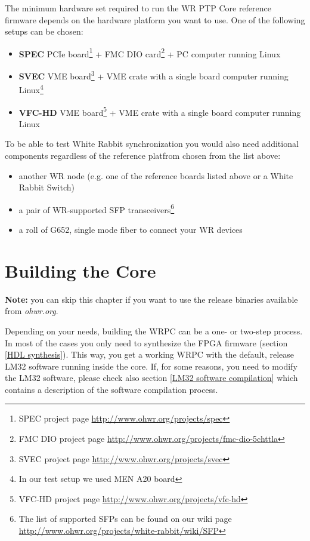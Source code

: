 \documentclass[a4paper, 12pt]{article}
\begin{document}
The minimum hardware set required to run the WR PTP Core reference firmware
depends on the hardware platform you want to use. One of the following setups
can be chosen:
\begin{itemize}
  \item {\bf SPEC} PCIe board\footnote{SPEC project page
    \url{http://www.ohwr.org/projects/spec}} + FMC DIO card\footnote{FMC DIO
    project page \url{http://www.ohwr.org/projects/fmc-dio-5chttla}} + PC
    computer running Linux
  
  \item  {\bf SVEC} VME board\footnote{SVEC project page
    \url{http://www.ohwr.org/projects/svec}} + VME crate with a single board
    computer running Linux\footnote{\label{note_a20}In our test setup we used MEN A20 board}

  \item {\bf VFC-HD} VME board\footnote{VFC-HD project page
    \url{http://www.ohwr.org/projects/vfc-hd}} + VME crate with a single board
  computer running Linux

\end{itemize}

To be able to test White Rabbit synchronization you would also need
additional components regardless of the reference platfrom chosen from the list
above:
\begin{itemize}
  \item another WR node (e.g. one of the reference boards listed above or a
    White Rabbit Switch)
  \item a pair of WR-supported SFP transceivers\footnote{The list of supported
    SFPs can be found on our wiki page
    \url{http://www.ohwr.org/projects/white-rabbit/wiki/SFP}}
  \item a roll of G652, single mode fiber to connect your WR devices
\end{itemize}

\newpage
\section{Building the Core}
\label{Building the Core}

\textbf{Note:} you can skip this chapter if you want to use the release binaries
available from \textit{ohwr.org}.

\vspace{1em}
Depending on your needs, building the WRPC can be a one- or two-step process.
In most of the cases you only need to synthesize the FPGA firmware (section
\ref{HDL synthesis}). This way, you get a working WRPC with the default, release
LM32 software running inside the core. If, for some reasons, you need to modify
the LM32 software, please check also section \ref{LM32 software compilation}
which contains a description of the software compilation process.
\end{document}

